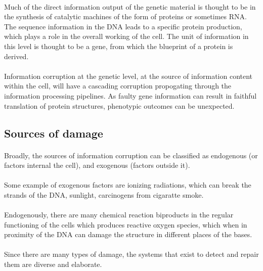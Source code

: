 \paragraph*{} Much of the direct information output of the genetic material is thought to be in the synthesis of catalytic machines of the form of proteins or sometimes RNA. The sequence information in the DNA leads to a specific protein production, which plays a role in the overall working of the cell. The unit of information in this level is thought to be a gene, from which the blueprint of a protein is derived.

\paragraph*{} Information corruption at the genetic level, at the source of information content within the cell, will have a cascading corruption propogating through the information processing pipelines. As faulty gene information can result in faithful translation of protein structures, phenotypic outcomes can be unexpected.

\subsection{Sources of damage}
\paragraph*{} Broadly, the sources of information corruption can be classified as endogenous (or factors internal the cell), and exogenous (factors outside it). 

\paragraph*{} Some example of exogenous factors are ionizing radiations, which can break the strands of the DNA, sunlight, carcinogens from cigaratte smoke. 

\paragraph*{} Endogenously, there are many chemical reaction biproducts in the regular functioning of the cells which produces reactive oxygen species, which when in proximity of the DNA can damage the structure in different places of the bases.

\paragraph*{} Since there are many types of damage, the systems that exist to detect and repair them are diverse and elaborate. 

